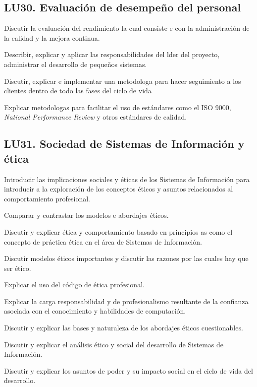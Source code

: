 \subsection{LU30. Evaluación de desempeño del personal}\label{sec:LU30}
\begin{LearningUnit}
\begin{LUGoal}
\item Discutir la evaluación del rendimiento  la cual consiste e con la administración de la calidad  y la mejora continua.
\end{LUGoal}

\begin{LUObjective}
\item Describir, explicar y aplicar las responsabilidades del l­der del proyecto, administrar el desarrollo de pequeños sistemas.
\item Discutir, explicar e implementar una metodolog­a para hacer seguimiento a los clientes dentro de todo las fases del ciclo de vida
\item Explicar metodolog­as para facilitar el uso de estándares como el ISO 9000, {\it National Performance Review} y otros estándares de calidad.
\end{LUObjective}
\end{LearningUnit}

\subsection{LU31. Sociedad de Sistemas de Información y ética}\label{sec:LU31}
\begin{LearningUnit}
\begin{LUGoal}
\item Introducir las implicaciones sociales y éticas de los Sistemas de Información para introducir a la exploración de los conceptos éticos y asuntos relacionados al comportamiento profesional.
\item Comparar y contrastar los modelos e abordajes éticos.
\end{LUGoal}

\begin{LUObjective}
\item Discutir y explicar ética y comportamiento basado en principios as­ como el concepto de práctica ética en el área de Sistemas de Información.
\item Discutir modelos éticos importantes y discutir las razones por las cuales hay que ser ético.
\item Explicar el uso del código de ética profesional.
\item Explicar la carga responsabilidad y de profesionalismo resultante de la confianza asociada con el conocimiento y habilidades de computación.
\item Discutir y explicar las bases y naturaleza de los abordajes éticos cuestionables.
\item Discutir y explicar el análisis ético y social del desarrollo de Sistemas de Información.
\item Discutir y explicar los asuntos de poder y su impacto social en el ciclo de vida del desarrollo.
\end{LUObjective}
\end{LearningUnit}

